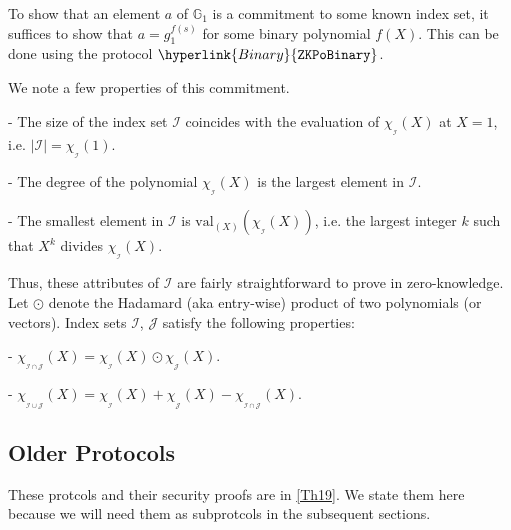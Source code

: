\documentclass[11pt, lettersize, notitlepage, leqno, footskip=0.6cm]{article}
\newcommand{\mc}{\mathcal}
\newcommand{\mb}{\mathbb}
\newcommand{\mr}{\mathrm}
\newcommand{\vs}{\vspace{-0.15cm}}
\newcommand{\noin}{\noindent}
\numberwithin{equation}{section}
\begin{document}
To show that an element $a$ of $\mb{G}_1$ is a commitment to some known index set, it suffices to show that $a = g_1^{f(s)}$ for some binary polynomial $f(X)$. This can be done using the protocol $\hyperlink{Binary}{\tt{ZKPoBinary}}$.

We note a few properties of this commitment. \vspace{2mm}

\noin - The size of the index set $\mc{I}$ coincides with the evaluation of $\chi_{_\mc{I}}(X)$ at $X= 1$, i.e. $|\mc{I}| = \chi_{_\mc{I}}(1)$. \vspace{1mm}


\noin - The degree of the polynomial $\chi_{_\mc{I}}(X)$ is the largest element in $\mc{I}$. \vspace{1mm}

\noin - The smallest element in $\mc{I}$ is $\mr{val}_{(X)}(\chi_{_\mc{I}}(X))$, i.e. the largest integer $k$ such that $X^k$ divides $\chi_{_\mc{I}}(X)$. \vspace{2mm}

Thus, these attributes of $\mc{I}$ are fairly straightforward to prove in zero-knowledge. Let $\odot$ denote the Hadamard (aka entry-wise) product of two polynomials (or vectors). Index sets $\mc{I}$, $\mc{J}$ satisfy the following properties:\vspace{2mm}

\noin - $\chi_{_{\mc{I}\cap \mc{J}}}(X) = \chi_{_\mc{I}}(X)\odot \chi_{_\mc{J}}(X)$. \vspace{1mm}

\noin - $\chi_{_{\mc{I}\cup \mc{J}}}(X) = \chi_{_\mc{I}}(X)+ \chi_{_\mc{J}}(X) - \chi_{_{\mc{I}\cap \mc{J}}}(X)$. \vspace{1mm}

 



\subsection{\fontsize{11}{11}\selectfont Older Protocols} 


These protcols and their security proofs are in \href{https://eprint.iacr.org/2019/1147}{[Th19]}. We state them here because we will need them as subprotcols in the subsequent sections.
\end{document}
